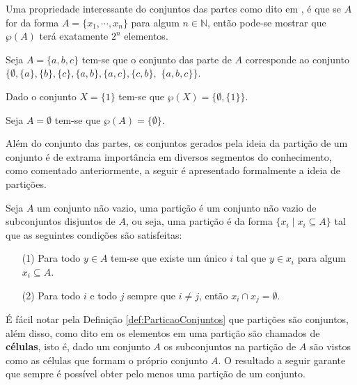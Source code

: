 Uma propriedade interessante do conjuntos das partes como dito em \cite{lipschutz1978-TC}, é que se $A$ for da forma $A = \{x_1, \cdots, x_n\}$ para algum $n \in \mathbb{N}$, então pode-se mostrar que $\wp(A)$ terá exatamente $2^n$ elementos.

\begin{exemplo}\label{exe:ConjuntoDasPartes1}
  Seja $A = \{a, b, c\}$ tem-se que o conjunto das parte de $A$ corresponde ao conjunto $\{\emptyset, \{a\}, \{b\}, \{c\}, \{a, b\},\{a, c\}, \{c, b\},$ $\{a, b, c\}\}$.
\end{exemplo}

\begin{exemplo}\label{exe:ConjuntoDasPartes2}
  Dado o conjunto $X = \{1\}$ tem-se que $\wp(X) = \{\emptyset, \{1\}\}$.
\end{exemplo}

\begin{exemplo}\label{exe:ConjuntoDasPartes3}
  Seja $A = \emptyset$ tem-se que $\wp(A) = \{\emptyset\}$.
\end{exemplo}

Além do conjunto das partes, os conjuntos gerados pela ideia da partição de um conjunto é de extrama importância em diversos segmentos do conhecimento, como comentado anteriormente, a seguir é apresentado formalmente a ideia de partições.

\begin{definicao}[Partição]\label{def:ParticaoConjuntos}
	Seja $A$ um conjunto não vazio, uma partição é um conjunto não vazio de subconjuntos disjuntos de $A$, ou seja, uma partição é da forma $\{x_i \mid x_i \subseteq A\}$ tal que as seguintes condições são satisfeitas:
	\begin{itemize}
		\item[(1)] Para todo $y \in A$ tem-se que existe um único $i$ tal que $y \in x_i$ para algum $x_i \subseteq A$.
		\item[(2)] Para todo $i$ e todo $j$ sempre que $i \neq j$, então $x_i \cap x_j = \emptyset$.
	\end{itemize}
\end{definicao}

É fácil notar pela Definição   \ref{def:ParticaoConjuntos}  que partições são conjuntos, além disso, como dito em \cite{lipschutz2013-MD} os elementos em uma partição são chamados de \textbf{células}, isto é, dado um conjunto $A$ os subconjuntos na partição de $A$ são vistos como as células que formam o próprio conjunto $A$. O resultado a seguir garante que sempre é possível obter pelo menos uma partição de um conjunto.


